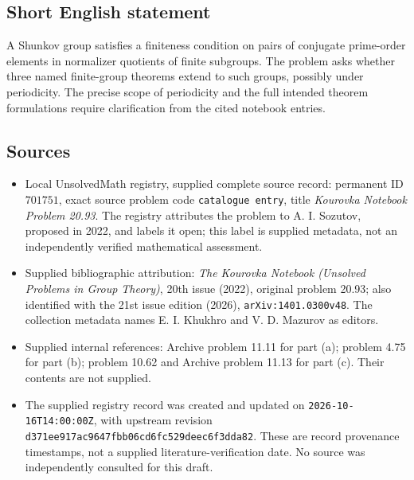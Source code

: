\documentclass[11pt]{article}
\begin{document}
\subsection{Short English statement}
A Shunkov group satisfies a finiteness condition on pairs of conjugate prime-order elements in normalizer quotients of finite subgroups. The problem asks whether three named finite-group theorems extend to such groups, possibly under periodicity. The precise scope of periodicity and the full intended theorem formulations require clarification from the cited notebook entries.
\subsection{Sources}
\begin{itemize}
\item Local UnsolvedMath registry, supplied complete source record: permanent ID \(701751\), exact source problem code \texttt{catalogue entry}, title \emph{Kourovka Notebook Problem 20.93}. The registry attributes the problem to A. I. Sozutov, proposed in 2022, and labels it open; this label is supplied metadata, not an independently verified mathematical assessment.
\item Supplied bibliographic attribution: \emph{The Kourovka Notebook (Unsolved Problems in Group Theory)}, 20th issue (2022), original problem 20.93; also identified with the 21st issue edition (2026), \texttt{arXiv:1401.0300v48}. The collection metadata names E. I. Khukhro and V. D. Mazurov as editors.
\item Supplied internal references: Archive problem 11.11 for part (a); problem 4.75 for part (b); problem 10.62 and Archive problem 11.13 for part (c). Their contents are not supplied.
\item The supplied registry record was created and updated on \texttt{2026-10-16T14:00:00Z}, with upstream revision \texttt{d371ee917ac9647fbb06cd6fc529deec6f3dda82}. These are record provenance timestamps, not a supplied literature-verification date. No source was independently consulted for this draft.
\end{itemize}
\end{document}

